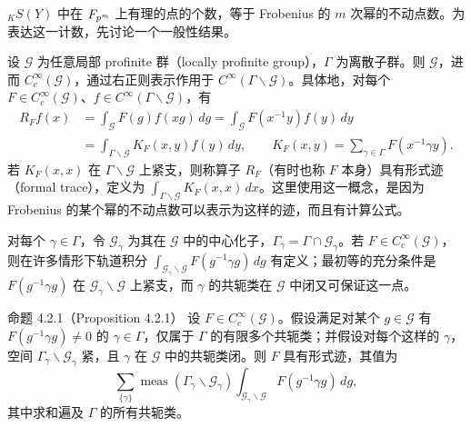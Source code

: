 ${}_KS(Y)$ 中在 $F_{p^m}$ 上有理的点的个数，等于 Frobenius 的 $m$ 次幂的不动点数。为表达这一计数，先讨论一个一般性结果。

设 $\mathcal G$ 为任意局部 profinite 群（locally profinite group），$\Gamma$ 为离散子群。则 $\mathcal G$，进而 $C_c^\infty(\mathcal G)$，通过右正则表示作用于 $C^\infty(\Gamma\backslash\mathcal G)$。具体地，对每个 $F\in C_c^\infty(\mathcal G)$、$f\in C^\infty(\Gamma\backslash\mathcal G)$，有
\[
 \begin{aligned}
 R_Ff(x)&=\int_{\mathcal G}F(g)f(xg)\,dg
 =\int_{\mathcal G}F(x^{-1}y)f(y)\,dy\\
 &=\int_{\Gamma\backslash\mathcal G}K_F(x,y)f(y)\,dy,
 \qquad K_F(x,y)=\sum_{\gamma\in\Gamma}F(x^{-1}\gamma y).
 \end{aligned}
\]
若 $K_F(x,x)$ 在 $\Gamma\backslash\mathcal G$ 上紧支，则称算子 $R_F$（有时也称 $F$ 本身）具有形式迹（formal trace），定义为 $\int_{\Gamma\backslash\mathcal G}K_F(x,x)\,dx$。这里使用这一概念，是因为Frobenius 的某个幂的不动点数可以表示为这样的迹，而且有计算公式。

对每个 $\gamma\in\Gamma$，令 $\mathcal G_\gamma$ 为其在 $\mathcal G$ 中的中心化子，$\Gamma_\gamma=\Gamma\cap\mathcal G_\gamma$。若 $F\in C_c^\infty(\mathcal G)$，则在许多情形下轨道积分 $\int_{\mathcal G_\gamma\backslash\mathcal G}F(g^{-1}\gamma g)\,dg$ 有定义；最初等的充分条件是 $F(g^{-1}\gamma g)$ 在 $\mathcal G_\gamma\backslash\mathcal G$ 上紧支，而 $\gamma$ 的共轭类在 $\mathcal G$ 中闭又可保证这一点。

\begin{originaltheorem}{命题 4.2.1（Proposition 4.2.1）}
设 $F\in C_c^\infty(\mathcal G)$。假设满足对某个 $g\in\mathcal G$ 有 $F(g^{-1}\gamma g)\ne0$ 的 $\gamma\in\Gamma$，仅属于 $\Gamma$ 的有限多个共轭类；并假设对每个这样的 $\gamma$，空间 $\Gamma_\gamma\backslash\mathcal G_\gamma$ 紧，且 $\gamma$ 在 $\mathcal G$ 中的共轭类闭。则 $F$ 具有形式迹，其值为
\[
 \sum_{\{\gamma\}}\operatorname{meas}(\Gamma_\gamma\backslash\mathcal G_\gamma)
 \int_{\mathcal G_\gamma\backslash\mathcal G}F(g^{-1}\gamma g)\,dg,
\]
其中求和遍及 $\Gamma$ 的所有共轭类。
\end{originaltheorem}

